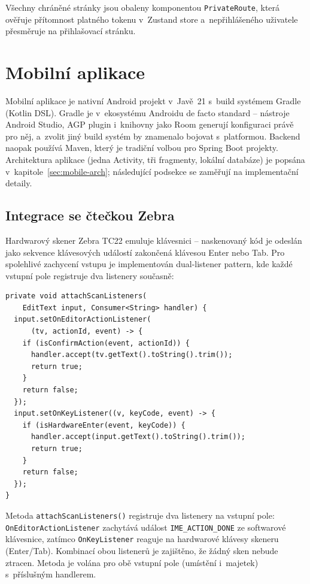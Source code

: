 Všechny chráněné stránky jsou obaleny komponentou \texttt{PrivateRoute}, která ověřuje přítomnost platného tokenu v~Zustand store a~nepřihlášeného uživatele přesměruje na přihlašovací stránku.

\section{Mobilní aplikace}

Mobilní aplikace je nativní Android projekt v~Javě~21 s~build systémem Gradle (Kotlin DSL). Gradle je v~ekosystému Androidu de facto standard -- nástroje Android Studio, AGP plugin i~knihovny jako Room generují konfiguraci právě pro něj, a~zvolit jiný build systém by znamenalo bojovat s~platformou. Backend naopak používá Maven, který je tradiční volbou pro Spring Boot projekty. Architektura aplikace (jedna Activity, tři fragmenty, lokální databáze) je popsána v~kapitole~\ref{sec:mobile-arch}; následující podsekce se zaměřují na implementační detaily.

\subsection{Integrace se čtečkou Zebra}

Hardwarový skener Zebra TC22 emuluje klávesnici -- naskenovaný kód je odeslán jako sekvence klávesových událostí zakončená klávesou Enter nebo Tab. Pro spolehlivé zachycení vstupu je implementován dual-listener pattern, kde každé vstupní pole registruje dva listenery současně:

\begin{listing}[H]
\caption{Dual-listener pro zachycení vstupu ze skeneru Zebra}\label{lst:duallistener}
\begin{verbatim}
private void attachScanListeners(
    EditText input, Consumer<String> handler) {
  input.setOnEditorActionListener(
      (tv, actionId, event) -> {
    if (isConfirmAction(event, actionId)) {
      handler.accept(tv.getText().toString().trim());
      return true;
    }
    return false;
  });
  input.setOnKeyListener((v, keyCode, event) -> {
    if (isHardwareEnter(event, keyCode)) {
      handler.accept(input.getText().toString().trim());
      return true;
    }
    return false;
  });
}
\end{verbatim}
\end{listing}

Metoda \texttt{attachScanListeners()} registruje dva listenery na vstupní pole: \texttt{OnEditorActionListener} zachytává událost \texttt{IME\_ACTION\_DONE} ze softwarové klávesnice, zatímco \texttt{OnKeyListener} reaguje na hardwarové klávesy skeneru (Enter/Tab). Kombinací obou listenerů je zajištěno, že žádný sken nebude ztracen. Metoda je volána pro obě vstupní pole (umístění i~majetek) s~příslušným handlerem.

